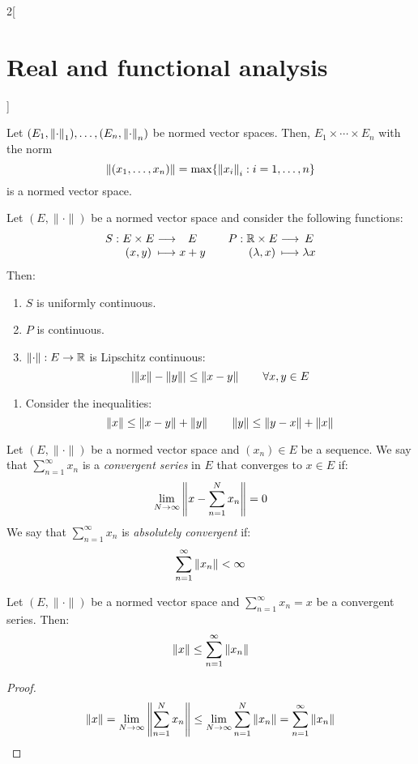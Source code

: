 \documentclass[../../../main_math.tex]{subfiles}
\begin{document}
\begin{multicols}{2}[\section{Real and functional analysis}]
  \begin{proposition}
    Let $(E_1,\left\|\cdot\right\|_1),\ldots,(E_n,\left\|\cdot\right\|_n)$ be normed vector spaces. Then, $E_1\times\cdots\times E_n$ with the norm $$\left\|(x_1,\ldots,x_n)\right\|=\max\{{\left\|x_i\right\|}_i:i=1,\ldots,n\}$$ is a normed vector space.
  \end{proposition}
  \begin{proposition}\label{RFA_sumproduct_func}
    Let $(E,\|\cdot\|)$ be a normed vector space and consider the following functions:
    $$\function{S}{E\times E}{E}{(x,y)}{x+y}\quad\function{P}{\RR\times E}{E}{(\lambda,x)}{\lambda x}$$ Then:
    \begin{enumerate}
      \item $S$ is uniformly continuous.
      \item $P$ is continuous.
      \item $\left\|\cdot\right\|:E\rightarrow\mathbb{R}$ is Lipschitz continuous: $$\abs{\left\|x\right\|-\left\|y\right\|}\leq\left\|x-y\right\|\qquad\forall x,y\in E$$
    \end{enumerate}
  \end{proposition}
  \begin{sproof}
    \begin{enumerate}
      \doubleitem It follows from the \ref{RFA_triangularineq}.
      \item Consider the inequalities: $$\left\|x\right\|\leq\left\|x-y\right\|+\left\|y\right\|\qquad\left\|y\right\|\leq\left\|y-x\right\|+\left\|x\right\|$$
    \end{enumerate}
  \end{sproof}
  \begin{definition}
    Let $(E,\|\cdot\|)$ be a normed vector space and $(x_n)\in E$ be a sequence. We say that $\sum_{n=1}^\infty x_n$ is a \emph{convergent series} in $E$ that converges to $x\in E$ if: $$\lim_{N\to\infty}\left\|x-\sum_{n=1}^N x_n\right\|=0 $$
    We say that $\sum_{n=1}^\infty x_n$ is \emph{absolutely convergent} if: $$\sum_{n=1}^\infty\left\|x_n\right\|<\infty$$
  \end{definition}
  \begin{proposition}
    Let $(E,\|\cdot\|)$ be a normed vector space and $\sum_{n=1}^\infty x_n=x$ be a convergent series. Then: $$\left\|x\right\|\leq \sum_{n=1}^\infty\left\|x_n\right\|$$
  \end{proposition}
  \begin{proof}
    $$\left\|x\right\|=\lim_{N\to\infty}\left\|\sum_{n=1}^N x_n\right\|\leq \lim_{N\to\infty}\sum_{n=1}^N\left\|x_n\right\|= \sum_{n=1}^\infty\left\|x_n\right\|$$
  \end{proof}
  \begin{definition}

\end{definition}
\end{multicols}
\end{document}
